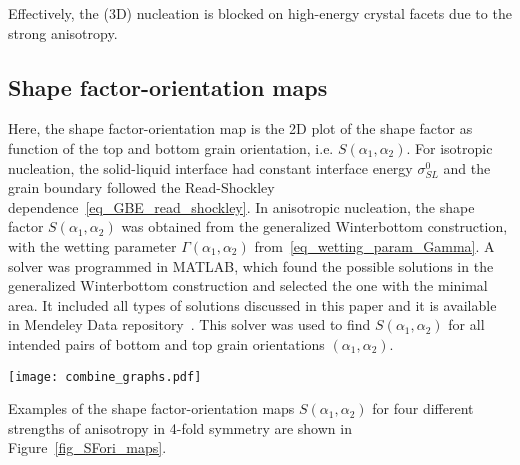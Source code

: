 	Effectively, the (3D) nucleation is blocked on high-energy crystal facets due to the strong anisotropy. 
	
	\subsection{Shape factor-orientation maps}
	Here, the shape factor-orientation map is the 2D plot of the shape factor as function of the top and bottom grain orientation, i.e. $S(\alpha_1,\alpha_2)$. For isotropic nucleation, the solid-liquid interface had constant interface energy $\sigma_{SL}^0$ and the grain boundary followed the Read-Shockley dependence~\eqref{eq_GBE_read_shockley}. In anisotropic nucleation, the shape factor $S(\alpha_1,\alpha_2)$ was obtained from the generalized Winterbottom construction, with the wetting parameter $\Gamma(\alpha_1,\alpha_2)$ from~\eqref{eq_wetting_param_Gamma}. A solver was programmed in MATLAB, which found the possible solutions in the generalized Winterbottom construction and selected the one with the minimal area. It included all types of solutions discussed in this paper and it is available in Mendeley Data repository~\cite{Minar2023dataset}. This solver was used to find $S(\alpha_1,\alpha_2)$ for all intended pairs of bottom and top grain orientations $(\alpha_1,\alpha_2)$.
	
	\begin{figure*}
		\centering        
		\texttt{[image: combine\_graphs.pdf]}
		\caption{Shape factor-orientation maps for four different strengths of anisotropy in 4-fold symmetry (180x180 points). In (a) is the isotropic case, in (b)-(c) the anisotropic ones, the strength of anisotropy $\delta$ is indicated above. The white regions indicate the unstable orientations as by the condition~\eqref{eq_3jun_stabcond_applied}. The levels are drawn with the increment of 0.25, like the colorbar spacing.}
		\label{fig_SFori_maps}
	\end{figure*}
	
	Examples of the shape factor-orientation maps $S(\alpha_1,\alpha_2)$ for four different strengths of anisotropy in 4-fold symmetry are shown in Figure~\ref{fig_SFori_maps}.
	
